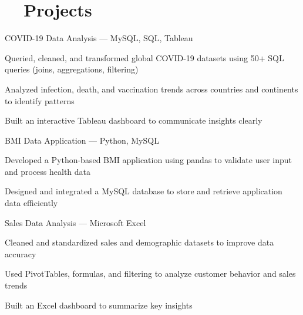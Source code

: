 \section[Projects]{\faCode~~Projects}

\begin{experience}{COVID-19 Data Analysis — MySQL, SQL, Tableau}{}{}
    \item Queried, cleaned, and transformed global COVID-19 datasets using 50+ SQL queries (joins, aggregations, filtering)
    \item Analyzed infection, death, and vaccination trends across countries and continents to identify patterns
    \item Built an interactive Tableau dashboard to communicate insights clearly
\end{experience}

\begin{experience}{BMI Data Application — Python, MySQL}{}{}
    \item Developed a Python-based BMI application using pandas to validate user input and process health data
    \item Designed and integrated a MySQL database to store and retrieve application data efficiently
\end{experience}

\begin{experience}[last]{Sales Data Analysis — Microsoft Excel}{}{}
    \item Cleaned and standardized sales and demographic datasets to improve data accuracy
    \item Used PivotTables, formulas, and filtering to analyze customer behavior and sales trends
    \item Built an Excel dashboard to summarize key insights
\end{experience}
